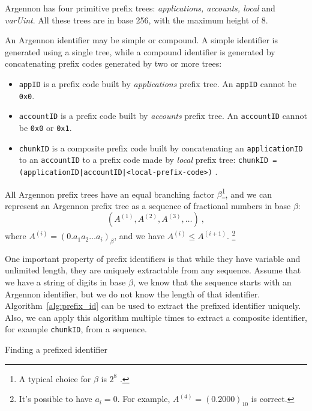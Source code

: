 Argennon has four primitive prefix trees:
\emph{applications, accounts, local} and \emph{varUint}.
All these trees are in base 256, with the maximum height
of 8.

An Argennon identifier may be simple or compound. A simple identifier is generated using a single tree, while a
compound identifier is generated by concatenating prefix codes generated by two or more trees:

\begin{itemize}
    \item \texttt{appID} is a prefix code built by \emph{applications} prefix tree. An \texttt{appID} cannot
    be \texttt{0x0}.

    \item \texttt{accountID} is a prefix code built by \emph{accounts} prefix tree. An \texttt{accountID} cannot
    be \texttt{0x0} or \texttt{0x1}.

    \item \texttt{chunkID} is a composite prefix code built by concatenating an \texttt{applicationID} to
    an \texttt{accountID} to a prefix code made by \emph{local} prefix tree:
    \subitem \texttt{chunkID = (applicationID|accountID|<local-prefix-code>)} .
\end{itemize}

All Argennon prefix trees have an equal branching factor \(\beta\)\footnote{A typical choice for \(\beta\) is \(2^8\)
    .}, and
we can represent an Argennon
prefix tree as a sequence of fractional numbers in base \(\beta\):
\[
    (A^{(1)},A^{(2)},A^{(3)},\dots)\ ,
\]
where \(A^{(i)}=(0.a_{1}a_{2}\dots a_{i})_\beta\), and we have \(A^{(i)} \leq A^{(i+1)}\). \footnote{It's possible to
have \(a_i=0\). For example, \(A^{(4)}=(0.2000)_{10}\) is correct.}

One important property of prefix identifiers is that while they have variable and unlimited length, they are
uniquely extractable from any sequence. Assume that we have a string of digits in base $\beta$, we
know that the sequence starts with an Argennon identifier, but we do not know the length of that identifier.
Algorithm~\ref{alg:prefix_id} can be used to extract the prefixed identifier uniquely. Also, we can apply this algorithm
multiple times to extract a composite identifier, for example \texttt{chunkID}, from a sequence.

\begin{algorithm}[t]
    \DontPrintSemicolon
    \BlankLine
    \BlankLine
    {
        {
            \;
        }
    }
    \;
    \caption{Finding a prefixed identifier}\label{alg:prefix_id}
\end{algorithm}

